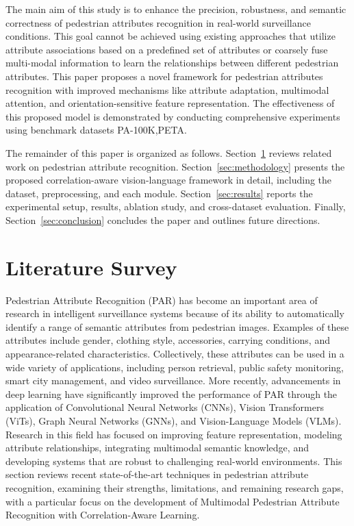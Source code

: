 \documentclass{ieeeaccess}
\begin{document}
The main aim of this study is to enhance the precision, robustness, and semantic correctness of pedestrian attributes recognition in real-world surveillance conditions. This goal cannot be achieved using existing approaches that utilize attribute associations based on a predefined set of attributes or coarsely fuse multi-modal information to learn the relationships between different pedestrian attributes. This paper proposes a novel framework for pedestrian attributes recognition with improved mechanisms like attribute adaptation, multimodal attention, and orientation-sensitive feature representation. The effectiveness of this proposed model is demonstrated by conducting comprehensive experiments using benchmark datasets PA-100K,PETA.
\par The remainder of this paper is organized as follows. Section~\ref{sec3} reviews related work on pedestrian attribute recognition. Section~\ref{sec:methodology} presents the proposed correlation-aware vision-language framework in detail, including the dataset, preprocessing, and each module. Section~\ref{sec:results} reports the experimental setup, results, ablation study, and cross-dataset evaluation. Finally, Section~\ref{sec:conclusion} concludes the paper and outlines future directions.


\section{Literature Survey}\label{sec3}
Pedestrian Attribute Recognition (PAR) has become an important area of research in intelligent surveillance systems because of its ability to automatically identify a range of semantic attributes from pedestrian images. Examples of these attributes include gender, clothing style, accessories, carrying conditions, and appearance-related characteristics. Collectively, these attributes can be used in a wide variety of applications, including person retrieval, public safety monitoring, smart city management, and video surveillance. More recently, advancements in deep learning have significantly improved the performance of PAR through the application of Convolutional Neural Networks (CNNs), Vision Transformers (ViTs), Graph Neural Networks (GNNs), and Vision-Language Models (VLMs). Research in this field has focused on improving feature representation, modeling attribute relationships, integrating multimodal semantic knowledge, and developing systems that are robust to challenging real-world environments. This section reviews recent state-of-the-art techniques in pedestrian attribute recognition, examining their strengths, limitations, and remaining research gaps, with a particular focus on the development of Multimodal Pedestrian Attribute Recognition with Correlation-Aware Learning.
\end{document}
